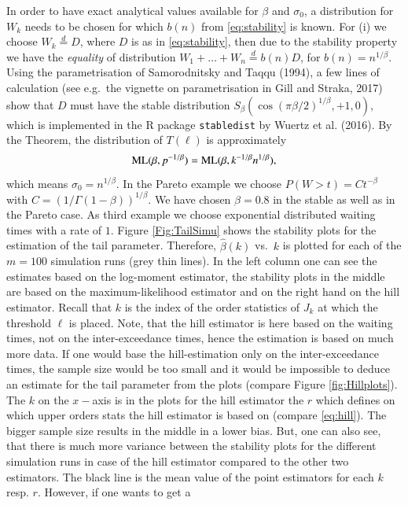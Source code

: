 \documentclass[]{elsarticle} %
\begin{document}
In order to have exact analytical values available for \(\beta\) and
\(\sigma_0\), a distribution for \(W_k\) needs to be chosen for which
\(b(n)\) from \eqref{eq:stability} is known. For (i) we choose
\(W_k \stackrel{d}{=} D\), where \(D\) is as in \eqref{eq:stability},
then due to the stability property we have the \emph{equality} of
distribution \(W_1 + \ldots + W_n \stackrel{d}{=} b(n) D\), for
\(b(n) = n^{1/\beta}\). Using the parametrisation of Samorodnitsky and
Taqqu (1994), a few lines of calculation (see e.g.~the vignette on
parametrisation in Gill and Straka, 2017) show that \(D\) must have the
stable distribution \(S_\beta(\cos(\pi \beta/2)^{1/\beta}, +1, 0)\),
which is implemented in the R package \texttt{stabledist} by Wuertz et
al. (2016). By the Theorem, the distribution of \(T(\ell)\) is
approximately \[
{\rm ML}(\beta, p^{-1/\beta}) 
= {\rm ML}(\beta, k^{-1/\beta} n^{1/\beta}),
\] which means \(\sigma_0 = n^{1/\beta}\). In the Pareto example we
choose \(P(W>t)=Ct^{-\beta}\) with \(C=(1/\Gamma(1-\beta))^{1/\beta}\).
We have chosen \(\beta=0.8\) in the stable as well as in the Pareto
case. As third example we choose exponential distributed waiting times
with a rate of \(1\). Figure \ref{Fig:TailSimu} shows the stability
plots for the estimation of the tail parameter. Therefore,
\(\hat \beta(k)\) vs.~\(k\) is plotted for each of the \(m=100\)
simulation runs (grey thin lines). In the left column one can see the
estimates based on the log-moment estimator, the stability plots in the
middle are based on the maximum-likelihood estimator and on the right
hand on the hill estimator. Recall that \(k\) is the index of the order
statistics of \(J_k\) at which the threshold \(\ell\) is placed. Note,
that the hill estimator is here based on the waiting times, not on the
inter-exceedance times, hence the estimation is based on much more data.
If one would base the hill-estimation only on the inter-exceedance
times, the sample size would be too small and it would be impossible to
deduce an estimate for the tail parameter from the plots (compare Figure
\ref{fig:Hillplots}). The \(k\) on the \(x-\)axis is in the plots for
the hill estimator the \(r\) which defines on which upper orders stats
the hill estimator is based on (compare \eqref{eq:hill}). The bigger
sample size results in the middle in a lower bias. But, one can also
see, that there is much more variance between the stability plots for
the different simulation runs in case of the hill estimator compared to
the other two estimators. The black line is the mean value of the point
estimators for each \(k\) resp. \(r\). However, if one wants to get a
\end{document}
